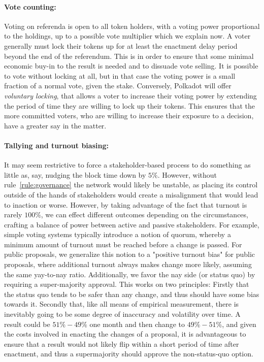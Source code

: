 \paragraph{Vote counting:} Voting on referenda is open to all token holders, with a voting power proportional to the holdings, up to a possible vote multiplier which we explain now. A voter generally must lock their tokens up for at least the enactment delay period beyond the end of the referendum. This is in order to ensure that some minimal economic buy-in to the result is needed and to dissuade vote selling. It is possible to vote without locking at all, but in that case the voting power is a small fraction of a normal vote, given the stake. Conversely, Polkadot will offer \emph{voluntary locking}, that allows a voter to increase their voting power by extending the period of time they are willing to lock up their tokens. This ensures that the more committed voters, who are willing to increase their exposure to a decision, have a greater say in the matter.

\paragraph{Tallying and turnout biasing:} It may seem restrictive to force a stakeholder-based process to do something as little as, say, nudging the block time down by $5\%$. However, without rule~\eqref{rule:governance} the network would likely be unstable, as placing its control outside of the hands of stakeholders would create a misalignment that would lead to inaction or worse. However, by taking advantage of the fact that turnout is rarely $100\%$, we can effect different outcomes depending on the circumstances, crafting a balance of power between active and passive stakeholders. For example, simple voting systems typically introduce a notion of quorum, whereby a minimum amount of turnout must be reached before a change is passed. For public proposals, we generalize this notion to a "positive turnout bias" for public proposals, where additional turnout always makes change more likely, assuming the same yay-to-nay ratio. Additionally, we favor the nay side (or status quo) by requiring a super-majority approval. This works on two principles: Firstly that the status quo tends to be safer than any change, and thus should have some bias towards it. Secondly that, like all means of empirical measurement, there is inevitably going to be some degree of inaccuracy and volatility over time. A result could be $51\%-49\%$ one month and then change to $49\%-51\%$, and given the costs involved in enacting the changes of a proposal, it is advantageous to ensure that a result would not likely flip within a short period of time after enactment, and thus a supermajority should approve the non-status-quo option. 

